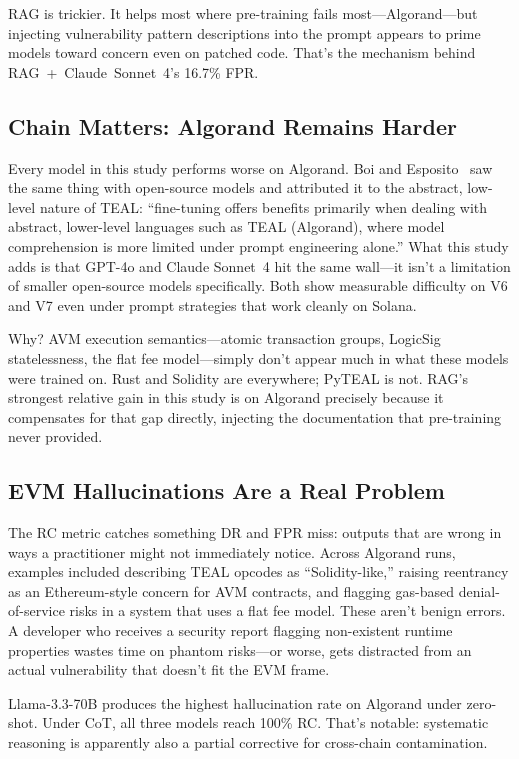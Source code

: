 \documentclass[journal]{IEEEtran}
\begin{document}
RAG is trickier.
It helps most where pre-training fails most---Algorand---but injecting
vulnerability pattern descriptions into the prompt appears to prime models
toward concern even on patched code.
That's the mechanism behind RAG~+~Claude~Sonnet~4's 16.7\% FPR.

\subsection{Chain Matters: Algorand Remains Harder}

Every model in this study performs worse on Algorand.
Boi and Esposito~\cite{boi2025prompt} saw the same thing with open-source models
and attributed it to the abstract, low-level nature of TEAL: ``fine-tuning
offers benefits primarily when dealing with abstract, lower-level languages
such as TEAL (Algorand), where model comprehension is more limited under
prompt engineering alone.''
What this study adds is that GPT-4o and Claude Sonnet~4 hit the same wall---it
isn't a limitation of smaller open-source models specifically.
Both show measurable difficulty on V6 and V7 even under prompt strategies that
work cleanly on Solana.

Why?
AVM execution semantics---atomic transaction groups, LogicSig statelessness,
the flat fee model---simply don't appear much in what these models were
trained on.
Rust and Solidity are everywhere; PyTEAL is not.
RAG's strongest relative gain in this study is on Algorand precisely because
it compensates for that gap directly, injecting the documentation that
pre-training never provided.

\subsection{EVM Hallucinations Are a Real Problem}

The RC metric catches something DR and FPR miss: outputs that are wrong in ways
a practitioner might not immediately notice.
Across Algorand runs, examples included describing TEAL opcodes as
``Solidity-like,'' raising reentrancy as an Ethereum-style concern for AVM
contracts, and flagging gas-based denial-of-service risks in a system that
uses a flat fee model.
These aren't benign errors.
A developer who receives a security report flagging non-existent runtime
properties wastes time on phantom risks---or worse, gets distracted from an
actual vulnerability that doesn't fit the EVM frame.

Llama-3.3-70B produces the highest hallucination rate on Algorand under
zero-shot.
Under CoT, all three models reach 100\% RC.
That's notable: systematic reasoning is apparently also a partial corrective
for cross-chain contamination.
\end{document}
